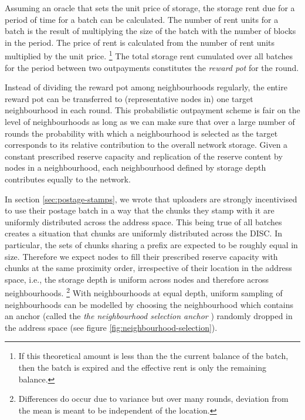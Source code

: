 Assuming an oracle that sets the unit price of storage, the storage rent due for a period of time for a batch can be calculated. The number of rent units for a batch is the result of multiplying the size of the batch with the number of blocks in the period. The price of rent is calculated from the number of rent units multiplied by the unit price.%
%
\footnote{If this theoretical amount is less than the the current balance of the batch, then the batch is expired and the effective rent is only the remaining balance.}
%
The total storage rent cumulated over all batches for the period between two outpayments constitutes the \emph{reward pot} for the round.

Instead of dividing the reward pot among neighbourhoods regularly, the entire reward pot can be transferred to (representative nodes in) one target neighbourhood in each round. This probabilistic outpayment scheme is fair on the level of neighbourhoods as long as we can make sure that over a large number of rounds the probability with which a  
neighbourhood is selected as the target corresponds to its relative contribution to the overall network storage. Given a constant prescribed reserve capacity and replication of the reserve content by nodes in a neighbourhood, each neighbourhood defined by storage depth contributes equally to the network. 

In section \ref{sec:postage-stamps}, we wrote that uploaders are strongly incentivised to use their postage batch in a way that the chunks they stamp with it are uniformly distributed across the address space. This being true of all batches creates a situation that chunks are uniformly distributed across the DISC. In particular, the sets of chunks sharing a prefix are expected to be roughly equal in size. Therefore we expect nodes to fill their prescribed reserve capacity with chunks at the same proximity order, irrespective of their location in the address space, i.e., the storage depth is uniform across  nodes and therefore across neighbourhoods.%
%
\footnote{Differences do occur due to variance but over many rounds, deviation from the mean is meant to be independent of the location.}
%
With neighbourhoods at equal depth, uniform sampling of neighbourhoods can be modelled by choosing the neighbourhood which contains an anchor (called the \emph{the neighbourhood selection anchor}%
%
%
) randomly dropped in the address space (see figure \ref{fig:neighbourhood-selection}).


